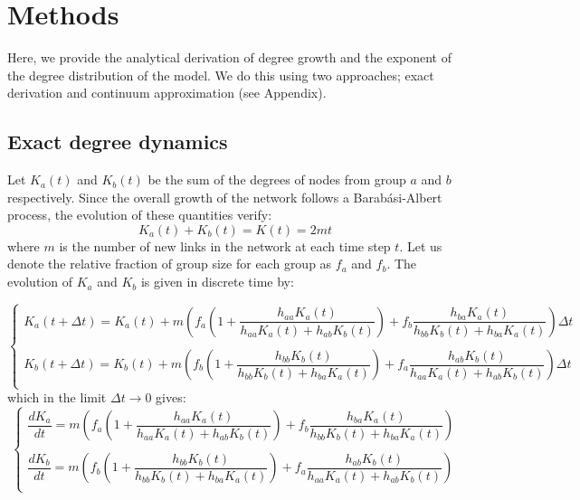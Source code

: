 \section{Methods}

Here, we provide the analytical derivation of degree growth and the exponent of the degree distribution of the model. We do this using two approaches; exact derivation and continuum approximation (see Appendix).

\subsection{Exact degree dynamics}
Let $K_a(t)$ and $K_b(t)$ be the sum of the degrees of nodes from group $a$ and $b$ respectively. Since the overall growth of the network follows a Barab\'asi-Albert process, the evolution of these quantities verify:
\begin{equation}\label{eq:kakb}
    K_a(t) + K_b(t) = K(t) = 2mt
\end{equation}
where $m$ is the number of new links in the network at each time step $t$. Let us denote the relative fraction of group size for each group as $f_a$ and $f_b$. The evolution of $K_a$ and $K_b$ is given in discrete time by:

\small
\begin{widetext}
\begin{equation}
 \left\{
  \begin{array}{l}
    K_a(t+\Delta t) = K_a(t) + m\left(f_a\left(1 + \dfrac{h_{aa}K_a(t)}{h_{aa}K_a(t) + h_{ab}K_b(t)}\right) + f_b\dfrac{h_{ba}K_a(t)}{h_{bb}K_b(t) + h_{ba}K_a(t)}\right)\Delta t\\
    \\
    K_b(t+\Delta t) = K_b(t) + m\left(f_b\left(1 + \dfrac{h_{bb}K_b(t)}{h_{bb}K_b(t) + h_{ba}K_a(t)}\right) + f_a\dfrac{h_{ab}K_b(t)}{h_{aa}K_a(t) + h_{ab}K_b(t)}\right)\Delta t\\
  \end{array}
 \right.
\end{equation}
\normalsize
which in the limit $\Delta t \rightarrow 0$ gives:
\small
\begin{equation}\label{eq:evol_ka}
\left\{
  \begin{array}{l}
    \dfrac{dK_a}{dt} = m\left(f_a\left(1 + \dfrac{h_{aa}K_a(t)}{h_{aa}K_a(t) + h_{ab}K_b(t)}\right) + f_b\dfrac{h_{ba}K_a(t)}{h_{bb}K_b(t) + h_{ba}K_a(t)}\right)\\
    \\
    \dfrac{dK_b}{dt} = m\left(f_b\left(1 + \dfrac{h_{bb}K_b(t)}{h_{bb}K_b(t) + h_{ba}K_a(t)}\right) + f_a\dfrac{h_{ab}K_b(t)}{h_{aa}K_a(t) + h_{ab}K_b(t)}\right)\\
  \end{array}
\right.
\end{equation}
\end{widetext}


